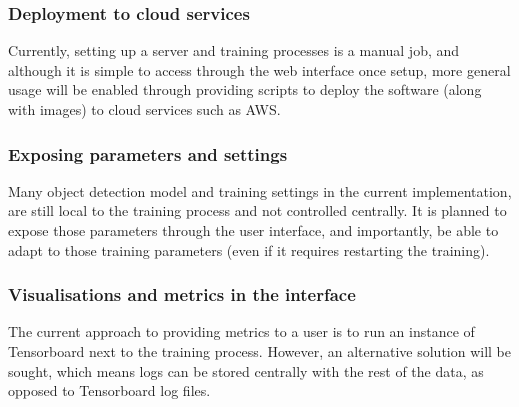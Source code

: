 \subsubsection {Deployment to cloud services}
Currently, setting up a server and training processes is a manual job, and although it is simple to access through the web interface once setup, more general usage will be enabled through providing scripts to deploy the software (along with images) to cloud services such as \gls{AWS}. 

\subsubsection {Exposing parameters and settings}
 Many object detection model and training settings in the current implementation, are still local to the training process and not controlled centrally. It is planned to expose those parameters through the user interface, and importantly, be able to adapt to those training parameters (even if it requires restarting the training).

\subsubsection{Visualisations and metrics in the interface}

The current approach to providing metrics to a user is to run an instance of Tensorboard next to the training process. However, an alternative solution will be sought, which means logs can be stored centrally with the rest of the data, as opposed to Tensorboard log files.

